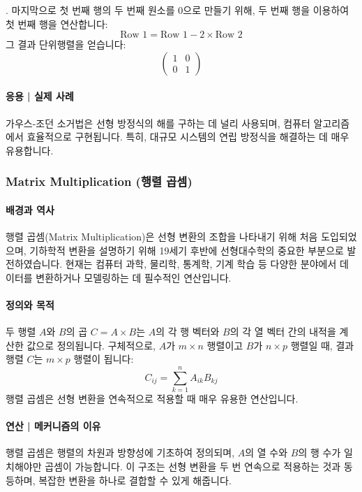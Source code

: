 . 마지막으로 첫 번째 행의 두 번째 원소를 0으로 만들기 위해, 두 번째 행을 이용하여 첫 번째 행을 연산합니다:
\[
  \text{Row 1} = \text{Row 1} - 2 \times \text{Row 2}
\]
그 결과 단위행렬을 얻습니다:
\[
  \begin{pmatrix} 1 & 0 \\ 0 & 1 \end{pmatrix}
\]

\paragraph{응용 | 실제 사례}
가우스-조던 소거법은 선형 방정식의 해를 구하는 데 널리 사용되며, 컴퓨터 알고리즘에서 효율적으로 구현됩니다. 특히, 대규모 시스템의 연립 방정식을 해결하는 데 매우 유용합니다.

\subsubsection{Matrix Multiplication (행렬 곱셈)}

\paragraph{배경과 역사}
행렬 곱셈(Matrix Multiplication)은 선형 변환의 조합을 나타내기 위해 처음 도입되었으며, 기하학적 변환을 설명하기 위해 19세기 후반에 선형대수학의 중요한 부분으로 발전하였습니다. 현재는 컴퓨터 과학, 물리학, 통계학, 기계 학습 등 다양한 분야에서 데이터를 변환하거나 모델링하는 데 필수적인 연산입니다.

\paragraph{정의와 목적}
두 행렬 \(A\)와 \(B\)의 곱 \(C = A \times B\)는 \(A\)의 각 행 벡터와 \(B\)의 각 열 벡터 간의 내적을 계산한 값으로 정의됩니다. 구체적으로, \(A\)가 \(m \times n\) 행렬이고 \(B\)가 \(n \times p\) 행렬일 때, 결과 행렬 \(C\)는 \(m \times p\) 행렬이 됩니다:
\[
  C_{ij} = \sum_{k=1}^{n} A_{ik} B_{kj}
\]
행렬 곱셈은 선형 변환을 연속적으로 적용할 때 매우 유용한 연산입니다.

\paragraph{연산 | 메커니즘의 이유}
행렬 곱셈은 행렬의 차원과 방향성에 기초하여 정의되며, \(A\)의 열 수와 \(B\)의 행 수가 일치해야만 곱셈이 가능합니다. 이 구조는 선형 변환을 두 번 연속으로 적용하는 것과 동등하며, 복잡한 변환을 하나로 결합할 수 있게 해줍니다.

